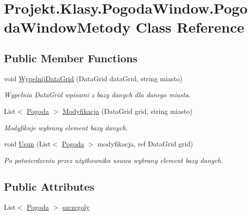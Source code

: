 \hypertarget{class_projekt_1_1_klasy_1_1_pogoda_window_1_1_pogoda_window_metody}{}\section{Projekt.\+Klasy.\+Pogoda\+Window.\+Pogoda\+Window\+Metody Class Reference}
\label{class_projekt_1_1_klasy_1_1_pogoda_window_1_1_pogoda_window_metody}
\subsection*{Public Member Functions}
\begin{DoxyCompactItemize}
\item 
void \mbox{\hyperlink{class_projekt_1_1_klasy_1_1_pogoda_window_1_1_pogoda_window_metody_a7c01d8d4ec88ec2f1bda388c4147d2b6}{Wypelnij\+Data\+Grid}} (Data\+Grid data\+Grid, string miasto)
\begin{DoxyCompactList}\small\item\em Wypełnia Data\+Grid wpisami z bazy danych dla danego miasta. \end{DoxyCompactList}\item 
List$<$ \mbox{\hyperlink{class_projekt_1_1_baza_1_1_pogoda}{Pogoda}} $>$ \mbox{\hyperlink{class_projekt_1_1_klasy_1_1_pogoda_window_1_1_pogoda_window_metody_a23b9223b25600a2e23299874d9acb739}{Modyfikacja}} (Data\+Grid grid, string miasto)
\begin{DoxyCompactList}\small\item\em Modyfikuje wybrany element bazy danych. \end{DoxyCompactList}\item 
void \mbox{\hyperlink{class_projekt_1_1_klasy_1_1_pogoda_window_1_1_pogoda_window_metody_ae8f5a295de3223c1ff949760eb1ce36e}{Usun}} (List$<$ \mbox{\hyperlink{class_projekt_1_1_baza_1_1_pogoda}{Pogoda}} $>$ modyfikacja, ref Data\+Grid grid)
\begin{DoxyCompactList}\small\item\em Po potwierdzeniu przez użytkownika usuwa wybrany element bazy danych. \end{DoxyCompactList}\end{DoxyCompactItemize}
\subsection*{Public Attributes}
\begin{DoxyCompactItemize}
\item 
List$<$ \mbox{\hyperlink{class_projekt_1_1_baza_1_1_pogoda}{Pogoda}} $>$ \mbox{\hyperlink{class_projekt_1_1_klasy_1_1_pogoda_window_1_1_pogoda_window_metody_a83c3d93d6f5240995a53ed912484d500}{szczegoly}}
\end{DoxyCompactItemize}


